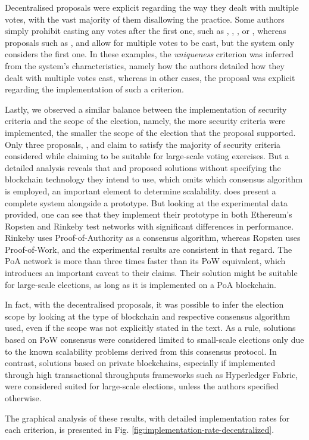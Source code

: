\documentclass[../access.tex]{subfiles}
\begin{document}
	\par
    Decentralised proposals were explicit regarding the way they dealt with multiple votes, with the vast majority of them disallowing the practice. Some authors simply prohibit casting any votes after the first one, such as \cite{Vo-Cao-Thuy2019}, \cite{Bosri2019}, \cite{Singh2019}, \cite{Vivek2020} or \cite{Vidwans2022}, whereas proposals such as \cite{Lai2018}, \cite{Takabatake2021} and \cite{Liu2017} allow for multiple votes to be cast, but the system only considers the first one. In these examples, the \textit{uniqueness} criterion was inferred from the system's characteristics, namely how the authors detailed how they dealt with multiple votes cast, whereas in other cases, the proposal was explicit regarding the implementation of such a criterion.
	\par
    Lastly, we observed a similar balance between the implementation of security criteria and the scope of the election, namely, the more security criteria were implemented, the smaller the scope of the election that the proposal supported. Only three proposals, \cite{Zaghloul2020}, \cite{Zhang2020} and \cite{Hu2022} claim to satisfy the majority of security criteria considered while claiming to be suitable for large-scale voting exercises. But a detailed analysis reveals that \cite{Zaghloul2020} and \cite{Zhang2020} proposed solutions without specifying the blockchain technology they intend to use, which omits which consensus algorithm is employed, an important element to determine scalability. \cite{Hu2022} does present a complete system alongside a prototype. But looking at the experimental data provided, one can see that they implement their prototype in both Ethereum's Ropsten and Rinkeby test networks with significant differences in performance. Rinkeby uses Proof-of-Authority as a consensus algorithm, whereas Ropsten uses Proof-of-Work, and the experimental results are consistent in that regard. The PoA network is more than three times faster than its PoW equivalent, which introduces an important caveat to their claims. Their solution might be suitable for large-scale elections, as long as it is implemented on a PoA blockchain.
	\par
    In fact, with the decentralised proposals, it was possible to infer the election scope by looking at the type of blockchain and respective consensus algorithm used, even if the scope was not explicitly stated in the text. As a rule, solutions based on PoW consensus were considered limited to small-scale elections only due to the known scalability problems derived from this consensus protocol. In contrast, solutions based on private blockchains, especially if implemented through high transactional throughputs frameworks such as Hyperledger Fabric, were considered suited for large-scale elections, unless the authors specified otherwise.
    \par
    The graphical analysis of these results, with detailed implementation rates for each criterion, is presented in Fig. \ref{fig:implementation-rate-decentralized}.
\end{document}

